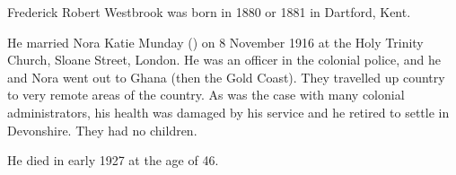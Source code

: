 
Frederick Robert Westbrook was born in 1880 or 1881 in Dartford, Kent.\cite{FrederickWestbrookBirth, FrederickWestbrookDeath} 

He married Nora Katie Munday () on 8 November 1916 at the Holy Trinity Church, Sloane Street, London. \cite{NoraMundayMarriage}  He was an officer in the colonial police, and he and Nora went out to Ghana (then the Gold Coast). They travelled up country to very remote areas of the country.
As was the case with many colonial administrators, his health was damaged by his service and he retired to settle in Devonshire. They had no children.

He died in early 1927 at the age of 46.\cite{FrederickWestbrookDeath}
